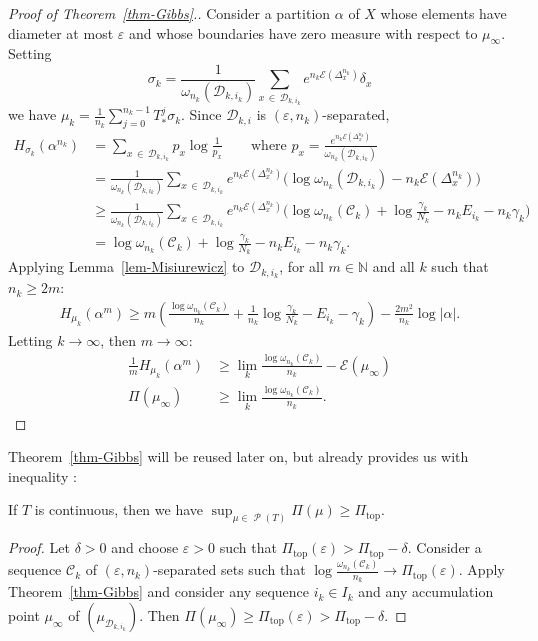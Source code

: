 \documentclass[10pt]{amsart}
\theoremstyle{definition}\newtheorem{defi}[theo]{Definition}\newtheorem{rema}[theo]{Remark}\newtheorem{exam}[theo]{Example}\newtheorem{exem}[theo]{Example}\newtheorem{nota}[theo]{Notation}
\theoremstyle{plain}
\theoremstyle{plain}
\newcommand\eps{\varepsilon}
\newcommand\NLP{\Pi}
\renewcommand\top{{\mathrm{top}}}
\newcommand\Prob{{\operatorname{\mathscr{P}}}}
\newcounter{In}
\newcommand{\Inref}[1]{\Circled{\ref{#1}}}
\newcommand*\8{\infty}
\newcommand\NN{\mathbb{N}}
\newcommand{\En}{\mathcal{E}}
\newcommand{\cD}{\mathcal{D}}
\newcommand{\cC}{\mathcal C}
\begin{document}
\begin{proof}[Proof of Theorem~\ref{thm-Gibbs}.]
Consider a partition $\alpha$ of $X$ whose elements have diameter at most $\eps$ and whose boundaries have zero measure with respect to $\mu_\infty$. Setting
\[
\sigma_k = \frac{1}{\omega_{n_k}(\cD_{k,i_k})} \sum_{x\,\in\,\cD_{k,i_k}} e^{n_k \En\left(\Delta_x^{n_k}\right)}\delta_x
\]
we have $\mu_k= \frac{1}{n_k} \sum_{j=0}^{n_k-1} T_*^j \sigma_k$. Since $\cD_{k,i}$ is $(\eps,n_k)$-separated,
\begin{align*}
H_{\sigma_k}(\alpha^{n_k}) &= \sum_{x\,\in\,\cD_{k,i_k}} p_x \log\frac{1}{p_x} \qquad\text{where } p_x = \frac{e^{n_k \En\left(\Delta_x^{n_k}\right)}}{\omega_{n_k}(\cD_{k,i_k})} \\
&= \frac{1}{\omega_{n_k}(\cD_{k,i_k})} \sum_{x\,\in\,\cD_{k,i_k}}e^{n_k \En\left(\Delta_x^{n_k}\right)} \big(\log \omega_{n_k}(\cD_{k,i_k}) -n_k\En\left(\Delta_x^{n_k}\right)\big) \\
&\ge \frac{1}{\omega_{n_k}(\cD_{k,i_k})} \sum_{x\,\in\,\cD_{k,i_k}}e^{n_k \En\left(\Delta_x^{n_k}\right)} \big(\log \omega_{n_k}(\cC_{k})+\log\frac{\gamma_k}{N_k} -n_k E_{i_k} -n_k\gamma_k\big) \\
&= \log \omega_{n_k}(\cC_{k})+\log\frac{\gamma_k}{N_k} -n_k E_{i_k} -n_k\gamma_k.
\end{align*}
Applying Lemma~\ref{lem-Misiurewicz} to $\cD_{k,{i_k}}$, for all $m\in\NN$ and all $k$ such that $n_k\ge 2m$:
\begin{align*}
H_{\mu_k}\left(\alpha^{m}\right)\ge m\left(\frac{\log \omega_{n_k}(\cC_{k})}{n_k}+ \frac1{n_k}\log\frac{\gamma_k}{N_k} - E_{i_k} -\gamma_k\right) -\frac{2m^2}{n_k}\log\lvert\alpha\rvert.
\end{align*}
Letting $k\to\infty$, then $m\to \infty$:
\begin{align*}
\frac 1m H_{\mu_k}(\alpha^{m}) &\ge \lim_k \frac{\log \omega_{n_k}(\cC_{k})}{n_k} -\En(\mu_\infty) \\
\NLP(\mu_\infty) &\ge \lim_k \frac{\log \omega_{n_k}(\cC_{k})}{n_k}.
\end{align*}
\end{proof}

Theorem~\ref{thm-Gibbs} will be reused later on, but already provides us with inequality \Inref{In:3}:

\begin{prop}\label{prop-lower-bound}
If $T$ is continuous, then we have $\sup_{\mu\in\Prob(T)} \NLP(\mu) \ge \NLP_\top$.
\end{prop}

\begin{proof}
Let $\delta>0$ and choose $\varepsilon>0$ such that $\NLP_\top(\varepsilon)>\NLP_\top-\delta$. Consider a sequence $\cC_k$ of $(\varepsilon,n_k)$-separated sets such that $\log\frac{\omega_{n_k}(\cC_k)}{n_k} \to \NLP_\top(\varepsilon)$. Apply Theorem~\ref{thm-Gibbs} and consider any sequence $i_k\in I_k$ and any accumulation point $\mu_\infty$ of $(\mu_{\cD_{k,i_k}})$. Then $\NLP(\mu_\infty)\ge \NLP_\top(\varepsilon)>\NLP_\top-\delta$.
\end{proof}
\end{document}
